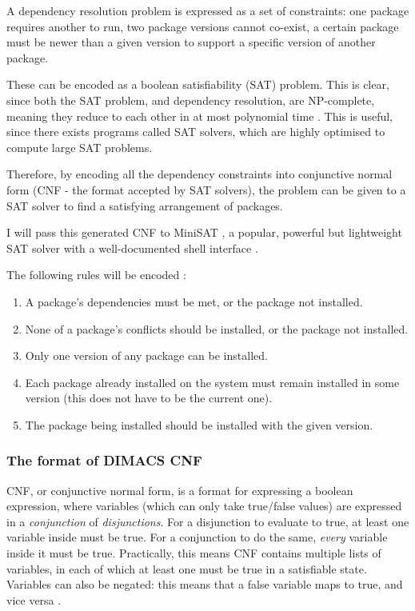 \documentclass[10pt]{article}
\begin{document}
A dependency resolution problem is expressed as a set of constraints: one package requires another to run, two package versions cannot co-exist, a certain package must be newer than a given version to support a specific version of another package.

These can be encoded as a boolean satisfiability (SAT) problem. This is clear, since both the SAT problem, and dependency resolution, are NP-complete, meaning they reduce to each other in at most polynomial time \cite{DependenciesFormal}. This is useful, since there exists programs called SAT solvers, which are highly optimised to compute large SAT problems.

Therefore, by encoding all the dependency constraints into conjunctive normal form (CNF - the format accepted by SAT solvers), the problem can be given to a SAT solver to find a satisfying arrangement of packages.

I will pass this generated CNF to MiniSAT \cite{MiniSATPaper}, a popular, powerful but lightweight SAT solver with a well-documented shell interface \cite{MiniSATGuide}.

The following rules will be encoded \cite{DepsToCNF}:

\begin{enumerate}
    \item A package's dependencies must be met, or the package not installed.
    \item None of a package's conflicts should be installed, or the package not installed.
    \item Only one version of any package can be installed.
    \item Each package already installed on the system must remain installed in some version (this does not have to be the current one).
    \item The package being installed should be installed with the given version.
\end{enumerate}

\subsubsection{The format of DIMACS CNF}

CNF, or conjunctive normal form, is a format for expressing a boolean expression, where variables (which can only take true/false values) are expressed in a \textit{conjunction} of \textit{disjunctions}. For a disjunction to evaluate to true, at least one variable inside must be true. For a conjunction to do the same, \textit{every} variable inside it must be true. Practically, this means CNF contains multiple lists of variables, in each of which at least one must be true in a satisfiable state. Variables can also be negated: this means that a false variable maps to true, and vice versa \cite{CNF}.
\end{document}

